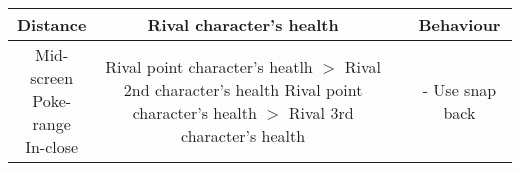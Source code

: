 \documentclass{article}
\begin{document}
\begin{landscape}

\begin{table}[h!]
  \begin{center}
    \begin{tabular*}{16cm}{c|c|c|c}
      \textbf{Distance} & \textbf{Rival character's health} & \textbf{} & \textbf{Behaviour}\\
      \hline
      \makecell{Mid-screen \\ Poke-range \\ In-close} & \makecell{Rival point character's heatlh $>$ Rival 2nd character's health \\ Rival point character's health $>$ Rival 3rd character's health} & & - Use snap back\\
      \hline
        \end{tabular*}
  \end{center}
\end{table}

\end{landscape}

\newpage
\end{document}
